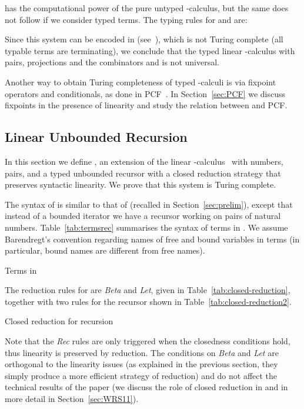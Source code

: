 \documentclass{article}
\begin{document}
has the computational power of the pure untyped -calculus, but the same does not follow if we consider typed terms. The typing rules for  and  are:

Since this system can be encoded in \LLCI (see~\cite{AlvesS:TCS}), which is not Turing complete (all typable terms are terminating), we conclude that the typed linear -calculus with pairs, projections and the combinators  and  is not universal.

Another way to obtain Turing completeness of typed -calculi is via fixpoint operators and conditionals, as done in PCF~\cite{Plotkin77}. In Section~\ref{sec:PCF} we discuss fixpoints in the presence of linearity and study the relation between  and PCF.
\subsection{Linear Unbounded Recursion}
\label{sec:LLCIrec}
In this section we define , an
extension of the linear -calculus~\cite{AbramskyS:comill}
with numbers, pairs, and a typed unbounded recursor with a closed
reduction strategy that preserves syntactic linearity. We prove that 
this system is Turing complete.


The syntax of \LLCIrec is similar to that of \LLCI (recalled in Section~\ref{sec:prelim}), except that
instead of a bounded iterator we have a recursor working on pairs of
natural numbers.  Table~\ref{tab:termsrec} summarises the syntax of
terms in .  We assume Barendregt's convention regarding names
of free and bound variables in terms (in particular, bound names are different from free names).

\begin{table*}

\caption{Terms in \LLCIrec}\label{LrecTerms}\label{tab:termsrec}
\end{table*}

The reduction rules for  are \emph{Beta} and \emph{Let}, 
given in Table~\ref{tab:closed-reduction}, together with
two rules for the recursor shown in Table~\ref{tab:closed-reduction2}.

\begin{table*}

\caption{Closed reduction for recursion}\label{tab:closed-reduction2}
\end{table*}


Note that the \emph{Rec} rules are only triggered when the closedness conditions
hold, thus linearity is preserved by reduction.  The
conditions on \emph{Beta} and \emph{Let} are orthogonal to the
linearity issues (as explained in the previous section, they simply
produce a more efficient strategy of reduction) and  do not
affect the technical results of the paper (we discuss the role of closed reduction in \LLCI and \LLCIrec in more detail in Section~\ref{sec:WRS11}).
\end{document}
